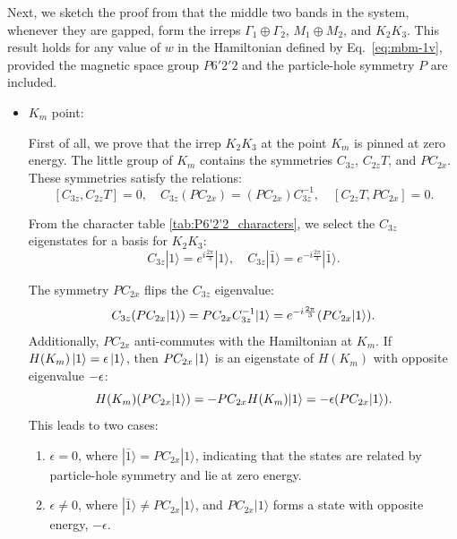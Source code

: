 Next, we sketch the proof from \cite{all_magic_angles} that the middle two bands in the system, whenever they are gapped, form the irreps \(\Gamma_1 \oplus \Gamma_2\), \(M_1 \oplus M_2\), and \(K_2K_3\). This result holds for any value of \(w\) in the Hamiltonian defined by Eq.~\eqref{eq:mbm-1v}, provided the magnetic space group \(P6'2'2\) and the particle-hole symmetry \(P\) are included.

\begin{itemize}
\item $K_m$ point:

First of all, we prove that the irrep \(K_2K_3\) at the point \(K_m\) is pinned at zero energy. The little group of \(K_m\) contains the symmetries \(C_{3z}\), \(C_{2z}T\), and \(PC_{2x}\). These symmetries satisfy the relations:
\begin{equation} \label{eq:proof_flatbands_Km_point_1}
[C_{3z}, C_{2z}T] = 0, \quad C_{3z}(PC_{2x}) = (PC_{2x})C_{3z}^{-1} , \quad [C_{2z}T, PC_{2x}] = 0.
\end{equation}

From the character table \ref{tab:P6'2'2_characters}, we select the \(C_{3z}\) eigenstates for a basis for \(K_2K_3\):
\begin{equation} \label{eq:proof_flatbands_Km_point_2}
C_{3z} |1\rangle = e^{i \frac{2\pi}{3}} |1\rangle, \quad C_{3z} |\bar{1}\rangle = e^{-i \frac{2\pi}{3}} |\bar{1}\rangle.
\end{equation}

The symmetry \(PC_{2x}\) flips the \(C_{3z}\) eigenvalue:
\begin{equation} \label{eq:proof_flatbands_Km_point_2}
C_{3z}\qty(PC_{2x} |1\rangle) = PC_{2x}C_{3z}^{-1} |1\rangle = e^{-i \frac{2\pi}{3}} \qty(PC_{2x} |1\rangle).
\end{equation}
Additionally, \(PC_{2x}\) anti-commutes with the Hamiltonian at $K_m$. If $H(K_m) \ket{1} = \epsilon \ket{1}$, then $PC_{2x} \ket{1}$ is an eigenstate of $H(K_m)$ with opposite eigenvalue $-\epsilon$:
\begin{equation} \label{eq:proof_flatbands_Km_point_2}
H(K_m) \qty(PC_{2x} |1\rangle) = -PC_{2x} H(K_m) |1\rangle = -\epsilon \qty(PC_{2x} |1\rangle).
\end{equation}
This leads to two cases:
\begin{enumerate}[label=(\Roman*)]
\item \(\epsilon = 0\), where \(|\bar{1}\rangle = PC_{2x} |1\rangle\), indicating that the states are related by particle-hole symmetry and lie at zero energy.
\item \(\epsilon \neq 0\), where \(|\bar{1}\rangle \neq PC_{2x} |1\rangle\), and \(PC_{2x} |1\rangle\) forms a state with opposite energy, \(-\epsilon\).
\end{enumerate}


\end{itemize}

